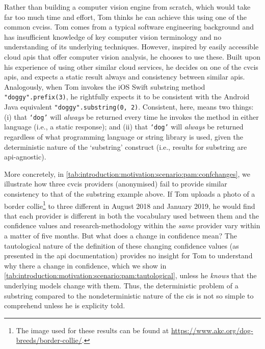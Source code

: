 Rather than building a computer vision engine from scratch, which would take far too much time and effort, Tom thinks he can achieve this using one of the common \glspl{cvcis}. Tom comes from a typical software engineering background and has insufficient knowledge of key computer vision terminology and no understanding of its underlying techniques. However, inspired by easily accessible cloud \glspl{api} that offer computer vision analysis, he chooses to use these. Built upon his experience of using other similar cloud services, he decides on one of the \gls{cvcis} \glspl{api}, and expects a static result always and consistency between similar \glspl{api}. Analogously, when Tom invokes the iOS Swift substring method \texttt{"doggy".prefix(3)}, he rightfully expects it to be consistent with the Android Java equivalent \texttt{"doggy".substring(0, 2)}. Consistent, here, means two things: (i) that \texttt{`dog'} will \textit{always} be returned every time he invokes the method in either language (i.e., a static response); and (ii) that \texttt{`dog'} will \textit{always} be returned regardless of what programming language or string library is used, given the deterministic nature of the `substring' construct (i.e., results for substring are \gls{api}-agnostic). 



More concretely, in \cref{tab:introduction:motivation:scenario:pam:confchanges}, we illustrate how three \gls{cvcis} providers (anonymised) fail to provide similar consistency to that of the substring example above. If Tom uploads a photo of a border collie\footnote{The image used for these results can be found at \url{https://www.akc.org/dog-breeds/border-collie/}.} to three different in August 2018 and January 2019, he would find that each provider is different in both the vocabulary used between them and the confidence values and research-methodology within the \textit{same} provider vary within a matter of five months. But what does a change in confidence mean? The tautological nature of the definition of these changing confidence values (as presented in the \gls{api} documentation) provides no insight for Tom to understand why there a change in confidence, which we show in \cref{tab:introduction:motivation:scenario:pam:tautological}, unless he \textit{knows} that the underlying models change with them. Thus, the deterministic problem of a substring compared to the nondeterministic nature of the \gls{cis} is not so simple to comprehend unless he is explicity told.



